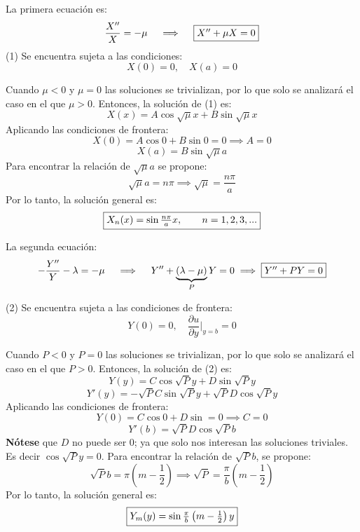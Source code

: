 \begin{solution}
\linea 

La primera ecuación es:
\begin{gather}
    \frac{X''}{X}= -\mu \quad \implies \quad \fbox{$X''+\mu X =0$}
\end{gather}
(1) Se encuentra sujeta a las condiciones: 
$$X(0)=0, \quad X(a)=0 $$

Cuando $\mu< 0$ y $\mu=0$ las soluciones se trivializan, por lo que solo se analizará el caso en el que $\mu >0$. Entonces, la solución de (1) es:
$$ X(x) = A\cos \sqrt{\mu} x + B\sin \sqrt{\mu} x $$
 Aplicando las condiciones de frontera: 
 $$X(0)= A\cos 0 + B\sin 0 = 0 \implies A=0$$
 $$X(a)= B\sin\sqrt{\mu}a$$
 Para encontrar la relación de $\sqrt{\mu}a$ se propone: 
 $$\sqrt{\mu} a= n\pi \implies \sqrt{\mu}=\frac{n\pi}{a}$$
 Por lo tanto, la solución general es: 
\begin{gather*}
    \fbox{$X_n(x)= \sin\frac{n\pi}{a}x,\qquad n=1,2,3,... $}
\end{gather*}
\linea 

La segunda ecuación:
\begin{gather}
    -\frac{Y''}{Y} -\lambda = -\mu\quad \implies \quad Y'' +\underbrace{(\lambda -\mu )}_{P}Y =0 \implies \fbox{$Y'' + PY=0$}
\end{gather}

(2) Se encuentra sujeta a las condiciones de frontera: 
$$Y(0)=0, \quad \frac{\partial u}{\partial y}\Big| _{y=b}=0$$

Cuando $P<0$ y $P=0$ las soluciones se trivializan, por lo que solo se analizará el caso en el que $P>0$. Entonces, la solución de (2) es: 
$$Y(y)= C\cos\sqrt{P}y+D\sin\sqrt{P}y$$
$$Y'(y)= -\sqrt{P}C\sin \sqrt{P}y+\sqrt{P}D\cos \sqrt{P}y $$
Aplicando las condiciones de frontera: 
$$Y(0)=C\cos 0+ D\sin = 0\implies C=0$$
$$Y'(b)= \sqrt{P}D\cos \sqrt{P}b$$
\textbf{Nótese} que $D$ no puede ser 0; ya que solo nos interesan las soluciones triviales. Es decir $\cos\sqrt{P}y =0$. Para encontrar la relación de $\sqrt{P}b$, se propone: 
$$\sqrt{P}b= \pi \left(m-\frac{1}{2}\right)\implies \sqrt{P}= \frac{\pi}{b}\left(m-\frac{1}{2}\right)$$
Por lo tanto, la solución general es: 
\begin{gather*}
    \fbox{$Y_m(y)= \sin\frac{\pi}{b}\left(m-\frac{1}{2}\right)y$}
\end{gather*}

\linea 


\end{solution}
